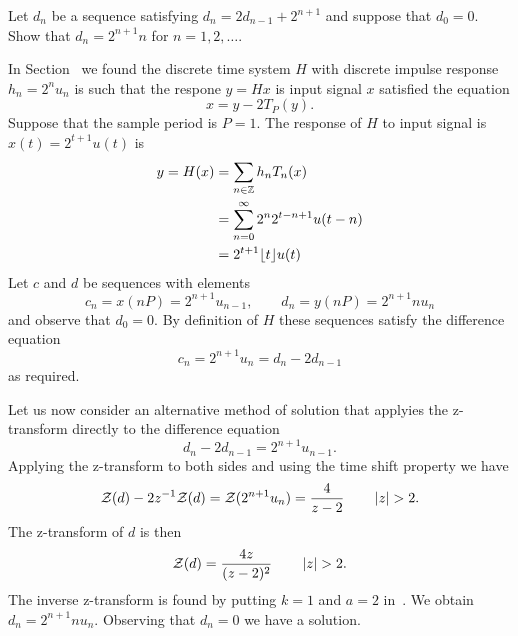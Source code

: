 \begin{excersizelist}
\item \label{exer:fftcomplexity} Let $d_n$ be a sequence satisfying $d_n = 2 d_{n-1} + 2^{n+1}$ and suppose that $d_0 = 0$.  Show that $d_n = 2^{n+1}n$ for $n = 1,2,\dots$.  %
\begin{solution}
In Section~ we found the discrete time system $H$ with discrete impulse response $h_n = 2^{n}u_n$ is such that the respone $y = Hx$ is input signal $x$ satisfied the equation
\[
x = y - 2 T_{P}(y).
\] 
Suppose that the sample period is $P=1$.  The response of $H$ to input signal is $x(t) = 2^{t+1}u(t)$ is
\begin{align*}
y = H(x) &= \sum_{n \in {\mathbb Z}} h_n T_{n}(x) \\
&= \sum_{n = 0}^\infty 2^n 2^{t-n+1}u(t-n) \\
&= 2^{t+1} {\left\lfloor t \right\rfloor}u(t)
\end{align*}
Let $c$ and $d$ be sequences with elements 
\[
c_n = x(nP) = 2^{n+1}u_{n-1}, \qquad d_n = y(nP) = 2^{n+1}n u_n
\]
and observe that $d_0 = 0$.  By definition of $H$ these sequences satisfy the difference equation
\[
c_n = 2^{n+1}u_n = d_n - 2 d_{n-1}
\]
as required.

Let us now consider an alternative method of solution that applyies the z-transform directly to the difference equation
\[
 d_n - 2 d_{n-1} = 2^{n+1} u_{n-1}.
\]
Applying the z-transform to both sides and using the time shift property we have
\[
{\mathcal Z}(d) - 2 z^{-1} {\mathcal Z}(d) = {\mathcal Z}(2^{n+1} u_n) = \frac{4}{z-2} \qquad \left\vert z \right\vert > 2.
\]
The z-transform of $d$ is then
\[
{\mathcal Z}(d) = \frac{4z}{(z-2)^2} \qquad \left\vert z \right\vert > 2.
\]
The inverse z-transform is found by putting $k=1$ and $a = 2$ in~.  We obtain $d_n = 2^{n+1} n u_n$.  Observing that $d_n = 0$ we have a solution.
\end{solution}


\end{excersizelist}
